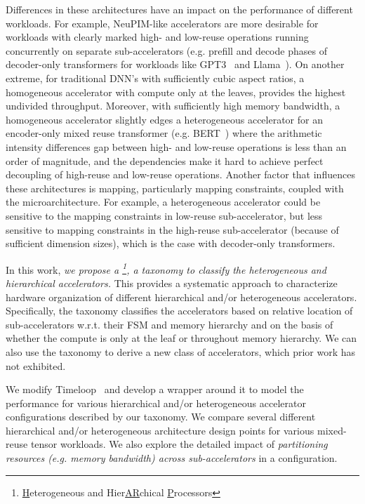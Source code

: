 Differences in these architectures have an impact on the performance of different workloads. For example, NeuPIM-like accelerators are more desirable for workloads with clearly marked high- and low-reuse operations running concurrently on separate sub-accelerators (e.g. prefill and decode phases of decoder-only transformers for workloads like GPT3~\cite{gpt3} and Llama~\cite{llama}). On another extreme, for traditional DNN's with sufficiently cubic aspect ratios, a homogeneous accelerator with compute only at the leaves, provides the highest undivided throughput. Moreover, with sufficiently high memory bandwidth, a homogeneous accelerator slightly edges a heterogeneous accelerator for an encoder-only mixed reuse transformer (e.g. BERT~\cite{bert}) where the arithmetic intensity differences gap between high- and low-reuse operations is less than an order of magnitude, and the dependencies make it hard to achieve perfect decoupling of high-reuse and low-reuse operations. Another factor that influences these architectures is mapping, particularly mapping constraints, coupled with the microarchitecture. For example, a heterogeneous accelerator could be sensitive to the mapping constraints in low-reuse sub-accelerator, but less sensitive to mapping constraints in the high-reuse sub-accelerator (because of sufficient dimension sizes), which is the case with decoder-only transformers.


In this work, \textit{we propose a \HHPNamenospace\footnote{\underline{H}eterogeneous and Hier\underline{AR}chical \underline{P}rocessors}, a taxonomy to classify the heterogeneous and hierarchical  accelerators.}
This provides a systematic approach to characterize hardware organization of different hierarchical and/or heterogeneous accelerators.
Specifically, the taxonomy classifies the accelerators based on relative location of sub-accelerators w.r.t. their FSM and memory hierarchy and on the basis of whether the compute is only at the leaf or throughout memory hierarchy.
We can also use the taxonomy to derive a new class of accelerators, which prior work has not exhibited.


We modify Timeloop~\cite{timeloop} and develop a wrapper around it to model the performance for various hierarchical and/or heterogeneous accelerator configurations described by our taxonomy. We compare several different hierarchical and/or heterogeneous architecture design points for various mixed-reuse tensor workloads.
We also explore the detailed impact of \textit{partitioning resources (e.g. memory bandwidth) across sub-accelerators} in a configuration.
